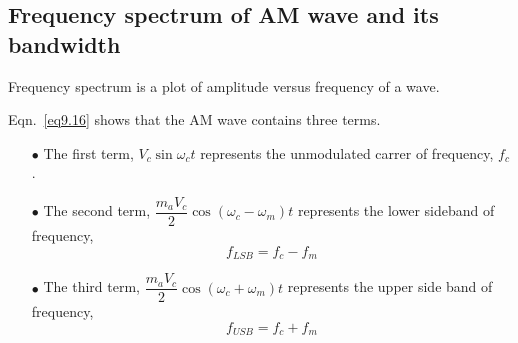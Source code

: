 \subsection{Frequency spectrum of AM wave and its bandwidth}\label{sec9.10.3}

Frequency spectrum is a plot of amplitude versus frequency of a wave.

Eqn.~\eqref{eq9.16} shows that the AM wave contains three terms. 
\begin{itemize}
\itemsep=0pt
\item[$\bullet$] The first term, $V_{c}\sin \omega_{c}t$ represents the unmodulated carrer of frequency, $f_{c}$.

\item[$\bullet$] The second term, $\dfrac{m_{a}V_{c}}{2}\cos (\omega_{c}-\omega_{m})t$ represents the lower sideband of frequency,
\begin{equation}
f_{LSB}=f_{c}-f_{m}\label{eq9.21}
\end{equation}

\item[$\bullet$] The third term, $\dfrac{m_{a}V_{c}}{2}\cos (\omega_{c}+\omega_{m})t$ represents the upper side band of frequency,
\begin{equation}
f_{USB}=f_{c}+f_{m}\label{add-eq9.22}
\end{equation}
\end{itemize}

\vfill\eject

